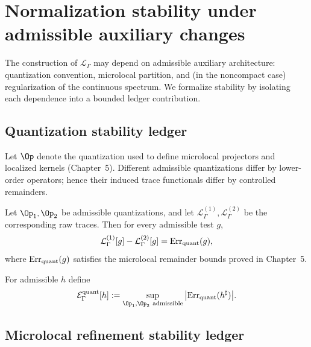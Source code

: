 \section{Normalization stability under admissible auxiliary changes}\label{sec:08.stability}

\noindent
The construction of $\mathcal L_\Gamma$ may depend on admissible auxiliary architecture:
quantization convention, microlocal partition, and (in the noncompact case) regularization of the continuous spectrum.
We formalize stability by isolating each dependence into a bounded ledger contribution.

\subsection{Quantization stability ledger}\label{subsec:08.quantization}

Let $\Op$ denote the quantization used to define microlocal projectors and localized kernels (Chapter~5).
Different admissible quantizations differ by lower-order operators; hence their induced trace functionals differ by controlled remainders.

\begin{assumption}\label{ass:08.quant-stability}
Let $\Op_1,\Op_2$ be admissible quantizations, and let $\mathcal L^{(1)}_\Gamma,\mathcal L^{(2)}_\Gamma$ be the corresponding raw traces.
Then for every admissible test $g$,
\begin{equation}\label{eq:08.quant.err}
\mathcal L^{(1)}_\Gamma[g]-\mathcal L^{(2)}_\Gamma[g]=\mathrm{Err}_{\mathrm{quant}}(g),
\end{equation}
where $\mathrm{Err}_{\mathrm{quant}}(g)$ satisfies the microlocal remainder bounds proved in Chapter~5.
\end{assumption}

\begin{definition}\label{def:08.quant-ledger}
For admissible $h$ define
\begin{equation}\label{eq:08.E.quant}
\mathcal E^{\mathrm{quant}}_\Gamma[h]
:=\sup_{\Op_1,\Op_2\ \mathrm{admissible}} \big|\Err_{\mathrm{quant}}(h^\sharp)\big|.
\end{equation}
\end{definition}

\subsection{Microlocal refinement stability ledger}\label{subsec:08.refinement}

